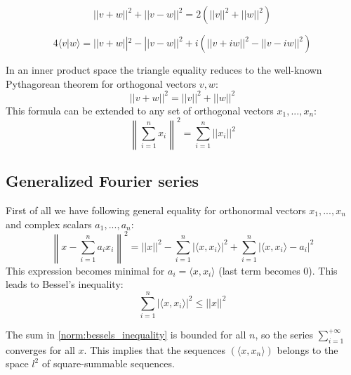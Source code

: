 	\begin{formula}
		\begin{equation}
			\label{linalgebra:parallellogram_law}
			||v+w||^2 + ||v-w||^2 = 2(||v||^2 + ||w||^2)
		\end{equation}
	\end{formula}
	\begin{formula}
		\begin{equation}
			\label{linalgebra:polarization_identity}
			4 \langle v|w \rangle = ||v+w||^2 - ||v-w||^2 + i\left(||v+iw||^2 - ||v-iw||^2\right)
		\end{equation}
	\end{formula}
	\begin{formula}
		In an inner product space the triangle equality reduces to the well-known Pythagorean theorem for orthogonal vectors $v, w$:
		\begin{equation}
			\label{linalgebra:pythagorean_theorem}
			||v+w||^2 = ||v||^2 + ||w||^2
		\end{equation}
		This formula can be extended to any set of orthogonal vectors $x_1, ..., x_n$:
		\begin{equation}
			\boxed{\left\lVert\sum_{i=1}^nx_i\right\rVert^2 = \sum_{i=1}^n||x_i||^2}
		\end{equation}
	\end{formula}

\subsection{Generalized Fourier series}

	\begin{property}
		First of all we have following general equality for orthonormal vectors $x_1, ..., x_n$ and complex scalars $a_1, ..., a_n$:
		\begin{equation}
			\left\lVert x - \sum_{i=1}^n a_ix_i\right\rVert^2 = ||x||^2 - \sum_{i=1}^n|\langle x, x_i\rangle|^2 + \sum_{i=1}^n|\langle x, x_i\rangle - a_i|^2
		\end{equation}
		This expression becomes minimal for $a_i = \langle x, x_i\rangle$ (last term becomes 0). This leads to Bessel's inequality:
		\begin{equation}
			\label{norm:bessels_inequality}
			\boxed{\sum_{i=1}^n|\langle x, x_i\rangle|^2 \leq ||x||^2}
		\end{equation}
	\end{property}
	\begin{result}
		The sum in \ref{norm:bessels_inequality} is bounded for all $n$, so the series $\sum_{i=1}^{+\infty}$ converges for all $x$. This implies that the sequences $(\langle x, x_n\rangle)$ belongs to the space $l^2$ of square-summable sequences.
	\end{result}
	
